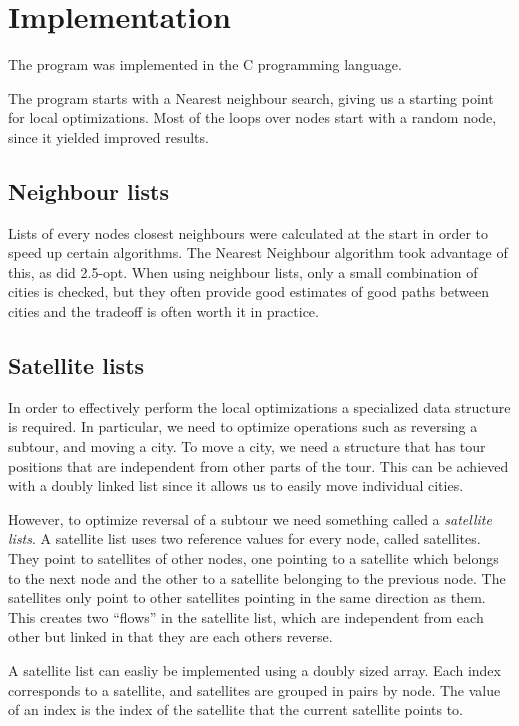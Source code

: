 \documentclass[paper=a4, fontsize=11pt,numbers=endperiod]{scrartcl} %
\numberwithin{equation}{section} %
\numberwithin{figure}{section} %
\numberwithin{table}{section} %
\begin{document}
\section{Implementation}
The program was implemented in the C programming language.

The program starts with a Nearest neighbour search, giving us a starting point for local optimizations.
Most of the loops over nodes start with a random node, since it yielded improved results.
\subsection{Neighbour lists}
Lists of every nodes closest neighbours were calculated at the start in order to speed up certain algorithms.
The Nearest Neighbour algorithm took advantage of this, as did 2.5-opt. When using neighbour lists, only a small combination of cities is checked, but they often provide good estimates of good paths between cities and the tradeoff is often worth it in practice.

\subsection{Satellite lists}
In order to effectively perform the local optimizations a specialized data structure is required.
In particular, we need to optimize operations such as reversing a subtour, and moving a city.
To move a city, we need a structure that has tour positions that are independent from other parts of the tour.
This can be achieved with a doubly linked list since it allows us to easily move individual cities.

However, to optimize reversal of a subtour we need something called a \emph{satellite lists}.\cite{satellite}
A satellite list uses two reference values for every node, called satellites.
They point to satellites of other nodes, one pointing to a satellite which belongs to the next node and the other to a satellite belonging to the previous node.
The satellites only point to other satellites pointing in the same direction as them.
This creates two ``flows'' in the satellite list, which are independent from each other but linked in that they are each others reverse.

A satellite list can easliy be implemented using a doubly sized array.
Each index corresponds to a satellite, and satellites are grouped in pairs by node.
The value of an index is the index of the satellite that the current satellite points to.
\end{document}
